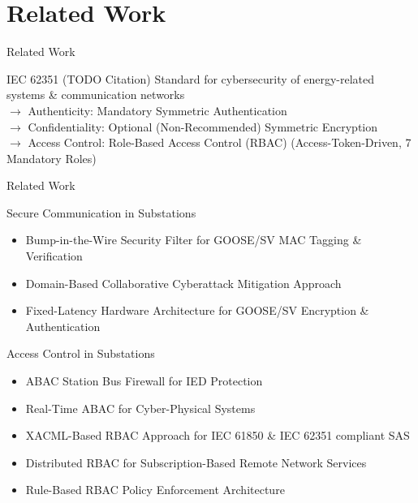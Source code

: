 \documentclass[en]{sdqbeamer}
\begin{document}
\section{Related Work}
\begin{frame}{Related Work}
    \begin{blueblock}{IEC 62351 (TODO Citation)}
        Standard for cybersecurity of energy-related systems \& communication networks
        \\$\rightarrow$ Authenticity: Mandatory Symmetric Authentication
        \\$\rightarrow$ Confidentiality: Optional (Non-Recommended) Symmetric Encryption
        \\$\rightarrow$ Access Control: Role-Based Access Control (RBAC) (Access-Token-Driven, 7 Mandatory Roles)
    \end{blueblock}
\end{frame}
\begin{frame}{Related Work}
    \begin{blueblock}{Secure Communication in Substations}
        \begin{itemize}
            \item Bump-in-the-Wire Security Filter for GOOSE/SV MAC Tagging \& Verification \parencite{Ishchenko2018}
            \item Domain-Based Collaborative Cyberattack Mitigation Approach \parencite{Hong2019}
            \item Fixed-Latency Hardware Architecture for GOOSE/SV Encryption \& Authentication \parencite{Rodriguez2021}
        \end{itemize}
    \end{blueblock}

    \begin{blueblock}{Access Control in Substations}
        \begin{itemize}
            \item ABAC Station Bus Firewall for IED Protection \parencite{Ruland2018}
            \item Real-Time ABAC for Cyber-Physical Systems \parencite{Burmester2013}
            \item XACML-Based RBAC Approach for IEC 61850 \& IEC 62351 compliant SAS \parencite{Lee2015}
            \item Distributed RBAC for Subscription-Based Remote Network Services \parencite{Ma2006} %
            \item Rule-Based RBAC Policy Enforcement Architecture \parencite{Alcaraz2016} %
        \end{itemize}
    \end{blueblock}
\end{frame}
\end{document}
